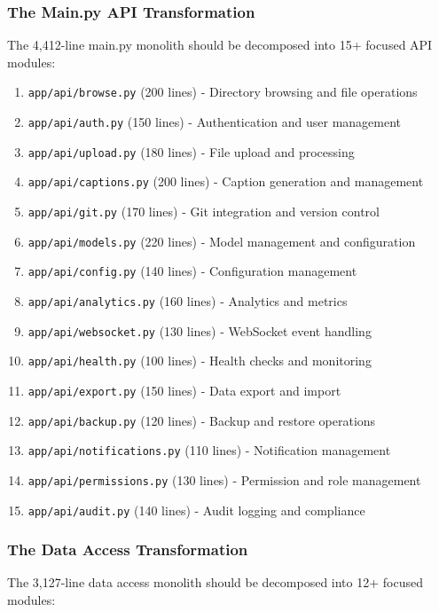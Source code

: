 \documentclass[11pt]{article}
\begin{document}
\subsubsection{The Main.py API Transformation}

The 4,412-line main.py monolith should be decomposed into 15+ focused API modules:

\begin{enumerate}
\item \texttt{app/api/browse.py} (200 lines) - Directory browsing and file operations
\item \texttt{app/api/auth.py} (150 lines) - Authentication and user management
\item \texttt{app/api/upload.py} (180 lines) - File upload and processing
\item \texttt{app/api/captions.py} (200 lines) - Caption generation and management
\item \texttt{app/api/git.py} (170 lines) - Git integration and version control
\item \texttt{app/api/models.py} (220 lines) - Model management and configuration
\item \texttt{app/api/config.py} (140 lines) - Configuration management
\item \texttt{app/api/analytics.py} (160 lines) - Analytics and metrics
\item \texttt{app/api/websocket.py} (130 lines) - WebSocket event handling
\item \texttt{app/api/health.py} (100 lines) - Health checks and monitoring
\item \texttt{app/api/export.py} (150 lines) - Data export and import
\item \texttt{app/api/backup.py} (120 lines) - Backup and restore operations
\item \texttt{app/api/notifications.py} (110 lines) - Notification management
\item \texttt{app/api/permissions.py} (130 lines) - Permission and role management
\item \texttt{app/api/audit.py} (140 lines) - Audit logging and compliance
\end{enumerate}

\subsubsection{The Data Access Transformation}

The 3,127-line data access monolith should be decomposed into 12+ focused modules:
\end{document}
